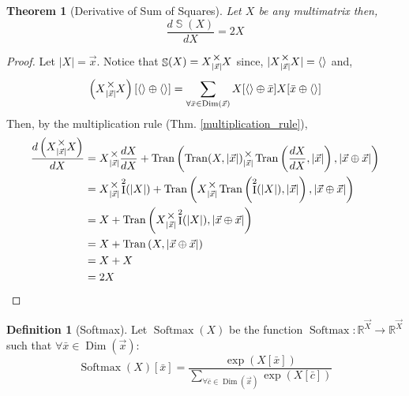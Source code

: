 \documentclass[12pt]{book}
\theoremstyle{plain}
\newtheorem{theorem}{Theorem}[chapter]
\theoremstyle{definition}
\newtheorem{definition}{Definition}[chapter]
\theoremstyle{ppart}
\theoremstyle{case}
\theoremstyle{solution}
\DeclareMathOperator{\Dim}{Dim}
\DeclareMathOperator{\Ident}{I}
\DeclareMathOperator{\Tran}{Tran}
\DeclareMathOperator{\SoS}{\mathbb{S}}
\DeclareMathOperator{\Softmax}{Softmax}
\newcommand{\mmult}[1]{\text{\raisebox{1ex}{$\underset{#1}{\times}$}}}
\begin{document}
\begin{theorem}[Derivative of Sum of Squares]
Let $X$ be any multimatrix then,
\[ \frac{d \SoS(X)}{dX} = 2X \]
\end{theorem}
\begin{proof}
Let $|X| = \vec{x}$. Notice that $\SoS(X) = X \mmult{|\vec{x}|} X$ since,
$|X \mmult{|\vec{x}|} X| = \left<\right>$ and,
\[
  \left(X \mmult{|\vec{x}|} X\right)[\left<\right> \oplus \left<\right>]
  =
  \sum_{\forall \bar{x} \in \Dim(\vec{x})}
    X[\left<\right> \oplus \bar{x}]
    X[\bar{x} \oplus \left<\right>]
\]
Then, by the multiplication rule (Thm. \ref{multiplication_rule}),
\begin{align*}
  \frac{d\left(X \mmult{|\vec{x}|} X\right)}{dX}
  &=
  X \mmult{|\vec{x}|} \frac{dX}{dX} +
  \Tran\left(
    \Tran(X, |\vec{x}|)
      \mmult{|\vec{x}|}
    \Tran\left(\frac{dX}{dX}, |\vec{x}|\right),
    |\vec{x} \oplus \vec{x}|
  \right) \\
  &=
  X \mmult{|\vec{x}|} \Ident^2(|X|) +
  \Tran\left(
    X
      \mmult{|\vec{x}|}
    \Tran\left(\Ident^2(|X|), |\vec{x}|\right),
    |\vec{x} \oplus \vec{x}|
  \right) \\
  &=
  X +
  \Tran\left(
    X
      \mmult{|\vec{x}|}
    \Ident^2(|X|),
    |\vec{x} \oplus \vec{x}|
  \right) \\
  &=
  X +
  \Tran\left(
    X,
    |\vec{x} \oplus \vec{x}|
  \right) \\
  &= X + X \\
  &= 2X
\end{align*}
\end{proof}

\begin{definition}[Softmax]
Let $\Softmax(X)$ be the function
$\Softmax : \mathbb{R}^{\vec{X}} \to \mathbb{R}^{\vec{X}}$
such that $\forall \bar{x} \in \Dim(\vec{x}):$
\[
  \Softmax(X)[\bar{x}] = \frac{
		\exp(X[\bar{x}])
	}{
		\sum_{\forall \bar{c} \in \Dim(\vec{x})} \exp(X[\bar{c}])
	}
\]
\end{definition}
\end{document}
